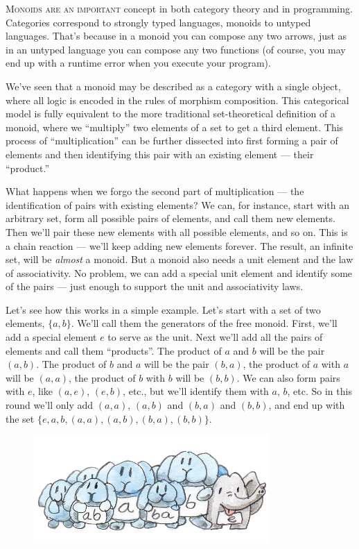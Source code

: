 
\lettrine[lhang=0.17]{M}{onoids are an important} concept in both category
theory and in programming. Categories correspond to strongly typed languages, 
monoids to untyped languages. That's because in a monoid you can compose any
two arrows, just as in an untyped language you can compose any two functions
(of course, you may end up with a runtime error when you execute your
program).

We've seen that a monoid may be described as a category with a single
object, where all logic is encoded in the rules of morphism composition.
This categorical model is fully equivalent to the more traditional
set-theoretical definition of a monoid, where we ``multiply'' two
elements of a set to get a third element. This process of
``multiplication'' can be further dissected into first forming a pair of
elements and then identifying this pair with an existing element ---
their ``product.''

What happens when we forgo the second part of multiplication --- the
identification of pairs with existing elements? We can, for instance,
start with an arbitrary set, form all possible pairs of elements, and
call them new elements. Then we'll pair these new elements with all
possible elements, and so on. This is a chain reaction --- we'll keep
adding new elements forever. The result, an infinite set, will be
\emph{almost} a monoid. But a monoid also needs a unit element and the
law of associativity. No problem, we can add a special unit element and
identify some of the pairs --- just enough to support the unit and
associativity laws.

Let's see how this works in a simple example. Let's start with a set of
two elements, $\{a, b\}$. We'll call them the generators of the
free monoid. First, we'll add a special element $e$ to serve as
the unit. Next we'll add all the pairs of elements and call them
``products''. The product of $a$ and $b$ will be the pair
$(a, b)$. The product of $b$ and $a$ will be the
pair $(b, a)$, the product of $a$ with $a$ will be
$(a, a)$, the product of $b$ with $b$ will be
$(b, b)$. We can also form pairs with $e$, like
$(a, e)$, $(e, b)$, etc., but we'll identify them with
$a$, $b$, etc. So in this round we'll only add
$(a, a)$, $(a, b)$ and $(b, a)$ and
$(b, b)$, and end up with the set
$\{e, a, b, (a, a), (a, b), (b, a), (b, b)\}$.

\begin{figure}[H]
\centering
\includegraphics[width=0.8\textwidth]{images/bunnies.jpg}
\end{figure}

